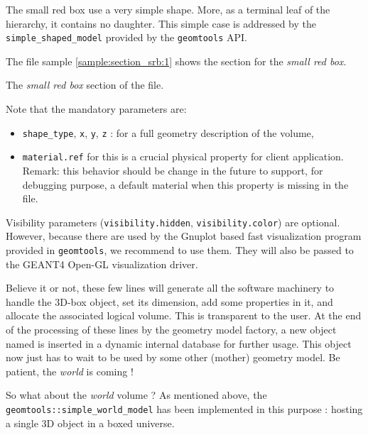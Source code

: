 \pn The  small red box  use a very  simple shape. More, as  a terminal
leaf of  the hierarchy, it contains  no daughter. This  simple case is
addressed  by  the   \texttt{simple\_shaped\_model}  provided  by  the
\texttt{geomtools} API.

\pn The file sample \ref{sample:section_srb:1} shows 
the section for the \emph{small red box}.

\begin{sample}[h]
\caption{The \emph{small red box}
  section of the   file.}
\label{sample:section_srb:1}
\end{sample}

\pn Note that the mandatory parameters are:
\begin{itemize}

\item \texttt{shape\_type}, \texttt{x}, \texttt{y}, \texttt{z} : for a
  full geometry description of the volume,

\item \texttt{material.ref}  for this  is a crucial  physical property
  for client application.\\ Remark:  this behavior should be change in
  the  future to support,  for debugging  purpose, a  default material
  when this property is missing in the file.
\end{itemize}

\pn       Visibility      parameters      (\texttt{visibility.hidden},
\texttt{visibility.color}) are  optional.  However, because  there are
used  by the  Gnuplot  based fast  visualization  program provided  in
\texttt{geomtools}, we recommend to use them. They will also be passed
to the GEANT4 Open-GL visualization driver.

\pn Believe it or not, these  few lines will generate all the software
machinery to  handle the  3D-box object, set  its dimension,  add some
properties in it, and allocate  the associated logical volume. This is
transparent to the  user. At the end of the  processing of these lines
by the geometry model factory, a new object named 
is inserted  in a  dynamic internal database  for further  usage. This
object now just has to wait to be used by some other (mother) geometry
model. Be patient, the \emph{world} is coming !

\pn So  what about the \emph{world}  volume ? As  mentioned above, the
\texttt{geomtools::simple\_world\_model} has  been implemented in this
purpose : hosting a single 3D object in a boxed universe.

